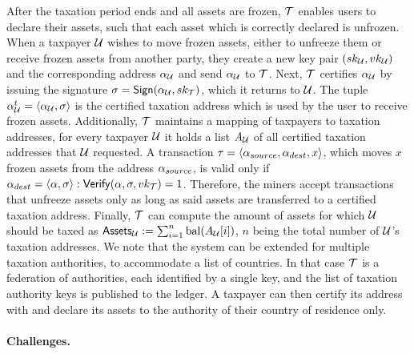 After the taxation period ends and all assets are frozen, $\taxAuth$ enables
users to declare their assets, such that each asset which is correctly declared
is unfrozen. When a taxpayer $\user$ wishes to move frozen assets, \ie either
to unfreeze them or receive frozen assets from another party, they create a new
key pair $\keypair[\user]$ and the corresponding address $\address_\user$ and
send $\address_\user$ to $\taxAuth$. Next, $\taxAuth$ certifies
$\address_\user$ by issuing the signature $\sig = \algosign(\address_\user,
\signkey_\taxAuth)$, which it returns to $\user$.  The tuple
$\address_\user^{t} = \langle \address_\user, \sig \rangle$ is the certified
taxation address which is used by the user to receive frozen assets.
Additionally, $\taxAuth$ maintains a mapping of taxpayers to taxation
addresses, \ie for every taxpayer $\user$ it holds a list $A_\user$ of all
certified taxation addresses that $\user$ requested.  A transaction $\tau =
\langle \address_{source}, \address_{dest}, x \rangle$, which moves $x$ frozen
assets from the address $\address_{source}$, is valid only if $\address_{dest}
= \langle \address, \sig \rangle: \algoverify(\address, \sig,
\verifykey_\taxAuth) = 1$. Therefore, the miners accept transactions that
unfreeze assets only as long as said assets are transferred to a certified
taxation address.  Finally, $\taxAuth$ can compute the amount of assets for
which $\user$ should be taxed as $\assets_\user := \sum_{i=1}^{n}
\balance(A_{\user}[i])$, $n$ being the total number of $\user$'s taxation
addresses. We note that the system can be extended for multiple taxation
authorities, \eg to accommodate a list of countries. In that case $\taxAuth$ is
a federation of authorities, each identified by a single key, and the list of
taxation authority keys is published to the ledger. A taxpayer can then certify
its address with and declare its assets to the authority of their country of
residence only.

\paragraph{Challenges.}

